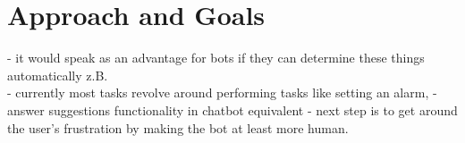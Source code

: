 













\section{Approach and Goals}


- it would speak as an advantage for bots if they can determine these things automatically z.B.\\
- currently most tasks revolve around performing tasks like setting an alarm, 
- answer suggestions functionality in chatbot equivalent
- next step is to get around the user's frustration by making the bot at least more human.	


